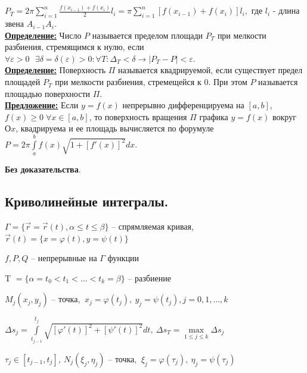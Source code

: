 \documentclass[a4paper,12pt]{article} %
\renewcommand {\geq}{\geqslant}
\begin{document}
$P_T=2\pi \sum\limits_{i=1}^n \frac{f(x_{i-1})+f(x_i)}{2}l_i=\pi \sum\limits_{i=1}^n [f(x_{i-1})+f(x_i)]l_i,$ где $l_i$ - длина звена $A_{i-1}A_i$.\\

\underline{\textbf{Определение:}} Число $P$ называется пределом площади $P_T$ при мелкости разбиения, стремящимся к нулю, если $\forall \varepsilon > 0 \text{ }\exists \delta=\delta(\varepsilon) > 0 : \forall T: \Delta_T<\delta \rightarrow |P_T-P|<\varepsilon$.\\

\underline{\textbf{Определение:}}  Поверхность $\Pi$ называется квадрируемой, если существует предел площадей $P_T$ при мелкости разбиения,  стремещейся к 0. При этом $P$ называется площадью поверхности $\Pi$.\\

\underline{\textbf{Предложение:}} Если $y=f(x)$ непрерывно дифференцируема на $[a, b]$, $f(x) \geq 0\; \forall x\in[a,b]$, то поверхность вращения $\Pi$ графика $y=f(x)$ вокруг $Оx$, квадрируема и ее площадь вычисляется по форумуле $P=2\pi \int\limits_a^b f(x) \sqrt{1+[f'(x)]^2}dx$.

\textbf{Без доказательства}.\\

\subsection{Криволинейные интегралы.}

 \hspace{2em} $\Gamma = \{ \vec{r} = \vec{r}(t), \alpha \leqslant t \leqslant \beta \}$ -- спрямляемая кривая, $\vec{r}(t) = \{ x = \varphi(t), y = \psi(t) \}$

\hspace{4em} $f, P, Q$ -- непрерывные на $\Gamma$ функции

\hspace{4em} T $= \{\alpha = t_0 < t_1 < \ldots < t_k = \beta\}$ -- разбиение

\hspace{4em} $M_j (x_j, y_j)$ -- точка, $ \ x_j = \varphi(t_j), \ y_j = \psi(t_j), j = 0, 1, \ldots, k$

\hspace{4em} $\Delta s_j = \int\limits_{t_{j-1}}^{t_j} \sqrt{\left[ \varphi'(t) \right]^2 + \left[ \psi'(t) \right]^2}dt, \ \Delta s_T = \max\limits_{1\leqslant j \leqslant k} \Delta s_j$

\hspace{4em} $\tau_j \in [t_{j-1}, t_j], \ N_j (\xi_j, \eta_j)$ -- точка, $ \ \xi_j = \varphi(\tau_j), \ \eta_j = \psi(\tau_j)$
\end{document}
